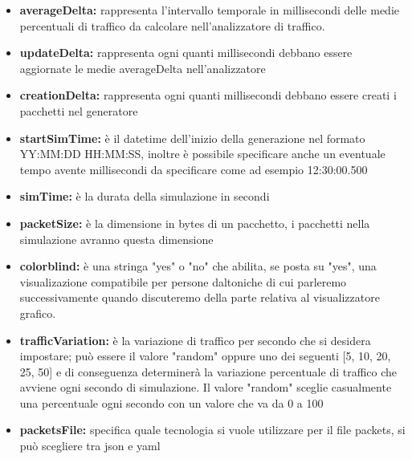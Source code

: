 \documentclass[binding=0.6cm]{sapthesis}
\begin{document}
\begin{itemize}
    \item \textbf{averageDelta:} rappresenta l'intervallo temporale in millisecondi 
    delle medie percentuali di traffico da calcolare nell'analizzatore di traffico.
    \item \textbf{updateDelta:} rappresenta ogni quanti millisecondi debbano essere aggiornate le medie averageDelta nell'analizzatore
    \item \textbf{creationDelta:} rappresenta ogni quanti millisecondi debbano essere creati i pacchetti nel generatore
    \item \textbf{startSimTime:} è il datetime dell'inizio della generazione nel formato \newline
    YY:MM:DD HH:MM:SS, inoltre è possibile specificare anche un eventuale tempo avente millisecondi da specificare come ad esempio 
    12:30:00.500
    \item \textbf{simTime:} è la durata della simulazione in secondi
    \item \textbf{packetSize:} è la dimensione in bytes di un pacchetto, i pacchetti nella simulazione avranno questa dimensione
    \item \textbf{colorblind:} è una stringa "yes" o "no" che abilita, se posta su "yes", una visualizazione compatibile per persone daltoniche
    di cui parleremo successivamente quando discuteremo della parte relativa al visualizzatore grafico.
    \item \textbf{trafficVariation:} è la variazione di traffico per secondo che si desidera impostare; 
    può essere il valore "random" oppure uno dei seguenti [5, 10, 20, 25, 50] e 
    di conseguenza determinerà la variazione percentuale di traffico che avviene 
    ogni secondo di simulazione. Il valore "random" sceglie casualmente una percentuale 
    ogni secondo con un valore che va da 0 a 100
    \item \textbf{packetsFile:} specifica quale tecnologia si vuole utilizzare per il file packets, 
    si può scegliere tra json e yaml
\end{itemize}
\end{document}
